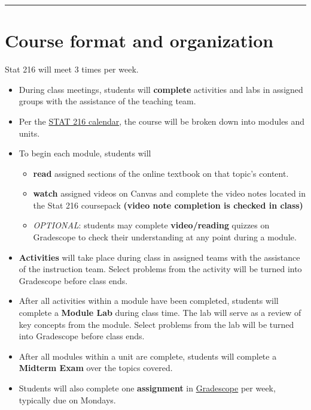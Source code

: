 \documentclass[
]{article}
\providecommand{\tightlist}{%
  \setlength{\itemsep}{0pt}\setlength{\parskip}{0pt}}
\begin{document}
\begin{center}\rule{0.5\linewidth}{0.5pt}\end{center}

\section{Course format and
organization}\label{course-format-and-organization}

Stat 216 will meet 3 times per week.

\begin{itemize}
\tightlist
\item
  During class meetings, students will \textbf{complete} activities and
  labs in assigned groups with the assistance of the teaching team.
\item
  Per the \href{calendars/F25-Stat216_Calendar.pdf}{STAT 216 calendar},
  the course will be broken down into modules and units.
\item
  To begin each module, students will

  \begin{itemize}
  \tightlist
  \item
    \textbf{read} assigned sections of the online textbook on that
    topic's content.
  \item
    \textbf{watch} assigned videos on Canvas and complete the video
    notes located in the Stat 216 coursepack \textbf{(video note
    completion is checked in class)}
  \item
    \emph{OPTIONAL}: students may complete \textbf{video/reading}
    quizzes on Gradescope to check their understanding at any point
    during a module.
  \end{itemize}
\item
  \textbf{Activities} will take place during class in assigned teams
  with the assistance of the instruction team. Select problems from the
  activity will be turned into Gradescope before class ends.
\item
  After all activities within a module have been completed, students
  will complete a \textbf{Module Lab} during class time. The lab will
  serve as a review of key concepts from the module. Select problems
  from the lab will be turned into Gradescope before class ends.
\item
  After all modules within a unit are complete, students will complete a
  \textbf{Midterm Exam} over the topics covered.
\item
  Students will also complete one \textbf{assignment} in
  \href{https://www.gradescope.com/}{Gradescope} per week, typically due
  on Mondays.
\end{itemize}
\end{document}
